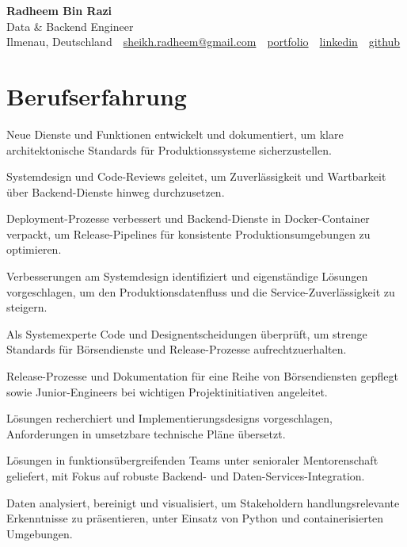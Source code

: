 \documentclass[11pt,a4paper]{resume}
\makeatletter
\newcommand{\Portfolio}{https://radheem.github.io/my-cv}
\newcommand{\PortfolioText}{portfolio}
\newcommand{\GitHub}{https://github.com/radheem}
\newcommand{\LinkedIn}{https://www.linkedin.com/in/radheem-razi}
\newcommand{\Email}{sheikh.radheem@gmail.com}
\makeatother
\begin{document}
\clearpage
{}

\begin{center}
  {\huge\bfseries Radheem Bin Razi}\\[3pt]
  {\large Data \& Backend Engineer}\\[6pt]
  \small
  Ilmenau, Deutschland \,\textbar\,
  \href{mailto:\Email}{\Email} \,\textbar\,
  \href{\Portfolio}{\PortfolioText} \,\textbar\,
  \href{\LinkedIn}{linkedin} \,\textbar\,
  \href{\GitHub}{github}
\end{center}
\vspace{2pt}

\section{Berufserfahrung}

\bullets
  \item Neue Dienste und Funktionen entwickelt und dokumentiert, um klare architektonische Standards für Produktionssysteme sicherzustellen.
  \item Systemdesign und Code-Reviews geleitet, um Zuverlässigkeit und Wartbarkeit über Backend-Dienste hinweg durchzusetzen.
  \item Deployment-Prozesse verbessert und Backend-Dienste in Docker-Container verpackt, um Release-Pipelines für konsistente Produktionsumgebungen zu optimieren.
\bulletsend
\vspace{3pt}
\bullets
  \item Verbesserungen am Systemdesign identifiziert und eigenständige Lösungen vorgeschlagen, um den Produktionsdatenfluss und die Service-Zuverlässigkeit zu steigern.
  \item Als Systemexperte Code und Designentscheidungen überprüft, um strenge Standards für Börsendienste und Release-Prozesse aufrechtzuerhalten.
  \item Release-Prozesse und Dokumentation für eine Reihe von Börsendiensten gepflegt sowie Junior-Engineers bei wichtigen Projektinitiativen angeleitet.
\bulletsend
\vspace{3pt}
\bullets
  \item Lösungen recherchiert und Implementierungsdesigns vorgeschlagen, Anforderungen in umsetzbare technische Pläne übersetzt.
  \item Lösungen in funktionsübergreifenden Teams unter senioraler Mentorenschaft geliefert, mit Fokus auf robuste Backend- und Daten-Services-Integration.
  \item Daten analysiert, bereinigt und visualisiert, um Stakeholdern handlungsrelevante Erkenntnisse zu präsentieren, unter Einsatz von Python und containerisierten Umgebungen.
\bulletsend
\vspace{3pt}
\end{document}
